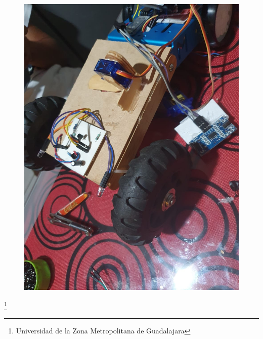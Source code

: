 \documentclass[11pt,a4paper]{article}
\begin{document}
\begin{figure}[hbtp]
\centering
\includegraphics[scale=0.2]{Pictures/Contruir.jpeg}
\caption{}
\end{figure}
\footnote{Universidad de la Zona Metropolitana de Guadalajara}
\end{document}
